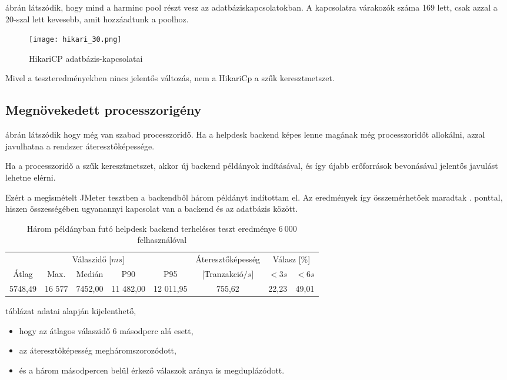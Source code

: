  ábrán látszódik, hogy mind a harminc pool részt vesz az adatbáziskapcsolatokban. A kapcsolatra várakozók száma 169 lett, csak azzal a 20-szal lett kevesebb, amit hozzáadtunk a poolhoz.


\begin{figure}[hbt] 
	\centering
	\texttt{[image: hikari\_30.png]}
	\caption{HikariCP adatbázis-kapcsolatai}
	\label{fig:hikari_30}
\end{figure}

Mivel a teszteredményekben nincs jelentős változás, nem a HikariCp a szűk keresztmetszet.

\pagebreak
\subsection{Megnövekedett processzorigény}
 ábrán látszódik hogy még van szabad processzoridő. Ha a helpdesk backend  képes lenne magának még processzoridőt allokálni, azzal javulhatna a rendszer áteresztőképessége. 

Ha a processzoridő a szűk keresztmetszet, akkor új backend példányok indításával, és így újabb erőforrások bevonásával jelentős javulást lehetne elérni.

Ezért a megismételt JMeter tesztben a backendből három példányt indítottam el. Az eredmények így összemérhetőek maradtak . ponttal, hiszen összességében ugyanannyi kapcsolat van a backend és az adatbázis között.


\begin{table}[hbt]
	
		\begin{tabular}{ccccc|c|cc}
			\multicolumn{5}{c|}{Válaszidő [$ms$]}  & Áteresztőképesség & \multicolumn{2}{c}{Válasz [\%]}	\\
			Átlag & Max. & Medián & P90 & P95 &	[Tranzakció$/s$] & $<3s$& $<6s$ \\
			\hline 
			5748,49 & 16 577 & 7452,00 & 11 482,00 & 12 011,95 & 755,62 & 22,23 & 49,01 \\
		\end{tabular} 
	
	\caption{Három példányban futó helpdesk backend terheléses teszt eredménye $6~000$ felhasználóval}
	\label{tabl:3_instance}
\end{table}


 táblázat adatai alapján kijelenthető,
\begin{itemize}
	\item hogy az átlagos válaszidő 6 másodperc alá esett,
	\item az áteresztőképesség megháromszorozódott,
	\item és a három másodpercen belül érkező válaszok aránya is megduplázódott.
\end{itemize}


